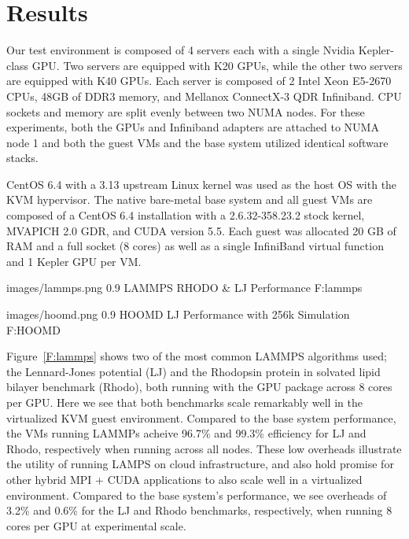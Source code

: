 \section{Results}

Our test environment is composed of 4 servers each with a single Nvidia Kepler-class GPU.  Two servers are equipped with K20 GPUs, while the other two servers are equipped with K40 GPUs.  Each server is composed of 2 Intel Xeon E5-2670 CPUs, 48GB of DDR3 memory, and Mellanox ConnectX-3 QDR Infiniband.  CPU sockets and memory are split evenly between two NUMA nodes.  For these experiments, both the GPUs and Infiniband adapters are attached to NUMA node 1 and both the guest VMs and the base system utilized identical software stacks.   

CentOS 6.4 with a 3.13 upstream Linux kernel was used as the host OS with the
KVM hypervisor.  The native bare-metal base system and all guest VMs are
composed of a CentOS 6.4 installation with a 2.6.32-358.23.2 stock kernel,
MVAPICH 2.0 GDR, and CUDA version 5.5. Each guest was allocated 20 GB of RAM and
a full socket (8 cores) as well as a single InfiniBand virtual function  and 1 Kepler GPU per VM.  





  {images/lammps.png}
  {0.9}
  {LAMMPS RHODO \& LJ Performance}
  {F:lammps}


  {images/hoomd.png}
  {0.9}
  {HOOMD LJ Performance with 256k Simulation}
  {F:HOOMD}

Figure~\ref{F:lammps} shows two of the most common LAMMPS algorithms used; the Lennard-Jones potential (LJ) and the Rhodopsin protein in solvated lipid bilayer benchmark (Rhodo), both running with the GPU package across 8 cores per GPU. Here we see that both benchmarks scale remarkably well in the virtualized KVM guest environment. 
Compared to the base system performance, the VMs running LAMMPs acheive 96.7\% and 99.3\% efficiency for LJ and Rhodo, respectively when running across all nodes.  These low overheads illustrate the utility of running LAMPS on cloud infrastructure, and also hold promise for other hybrid MPI + CUDA applications to also scale well in a virtualized environment. 
 Compared to the base system's performance, we see overheads of 3.2\% and 0.6\% for the LJ and Rhodo benchmarks, respectively, when running 8 cores per GPU at experimental scale. 


